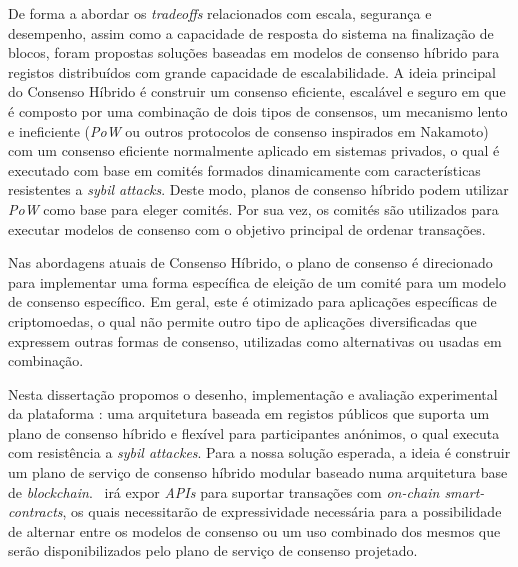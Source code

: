
%

De forma a abordar os \textit{tradeoffs} relacionados com escala, segurança e desempenho, assim como a capacidade de resposta do sistema na finalização de blocos, foram propostas soluções baseadas em modelos de consenso híbrido para registos distribuídos com grande capacidade de escalabilidade. A ideia principal do Consenso Híbrido é construir um consenso eficiente, escalável e seguro em que é composto por uma combinação de dois tipos de consensos, um mecanismo lento e ineficiente (\textit{PoW} ou outros protocolos de consenso inspirados em Nakamoto) com um consenso eficiente normalmente aplicado em sistemas privados, o qual é executado com base em comités formados dinamicamente com características resistentes a \textit{sybil attacks}. Deste modo, planos de consenso híbrido podem utilizar \textit{PoW} como base para eleger comités. Por sua vez, os comités são utilizados para executar modelos de consenso com o objetivo principal de ordenar transações.

Nas abordagens atuais de Consenso Híbrido, o plano de consenso é direcionado para implementar uma forma específica de eleição de um comité para um modelo de consenso específico. Em geral, este é otimizado para aplicações específicas de criptomoedas, o qual não permite outro tipo de aplicações diversificadas que expressem outras formas de consenso, utilizadas como alternativas ou usadas em combinação.

Nesta dissertação propomos o desenho, implementação e avaliação experimental da plataforma \mysystem: uma arquitetura baseada em registos públicos que suporta um plano de consenso híbrido e flexível para participantes anónimos, o qual executa com resistência a \textit{sybil attackes}. Para a nossa solução esperada, a ideia é construir um plano de serviço de consenso híbrido modular baseado numa arquitetura base de \textit{blockchain}. \mysystem~irá expor \textit{APIs} para suportar transações com \textit{on-chain smart-contracts}, os quais necessitarão de expressividade necessária para a possibilidade de alternar entre os modelos de consenso ou um uso combinado dos mesmos que serão disponibilizados pelo plano de serviço de consenso projetado.

